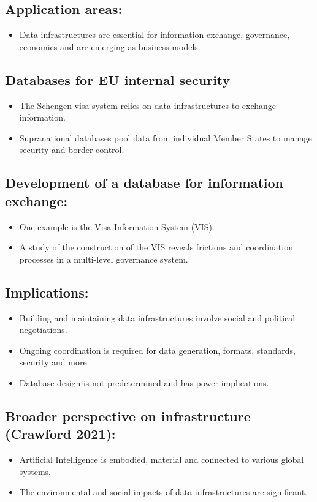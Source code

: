 \documentclass{article}
\begin{document}
\subsection*{Application areas:}
\begin{itemize}
    \item Data infrastructures are essential for information exchange, governance, economics and are emerging as business models.
\end{itemize}

\subsection*{Databases for EU internal security}
\begin{itemize}
    \item The Schengen visa system relies on data infrastructures to exchange information.
    \item Supranational databases pool data from individual Member States to manage security and border control.
\end{itemize}

\subsection*{Development of a database for information exchange:}
\begin{itemize}
    \item One example is the Visa Information System (VIS).
    \item A study of the construction of the VIS reveals frictions and coordination processes in a multi-level governance system.
\end{itemize}

\subsection*{Implications:}
\begin{itemize}
    \item Building and maintaining data infrastructures involve social and political negotiations.
    \item Ongoing coordination is required for data generation, formats, standards, security and more.
    \item Database design is not predetermined and has power implications.
\end{itemize}

\subsection*{Broader perspective on infrastructure (Crawford 2021):}
\begin{itemize}
    \item Artificial Intelligence is embodied, material and connected to various global systems.
    \item The environmental and social impacts of data infrastructures are significant.
\end{itemize}
\end{document}
